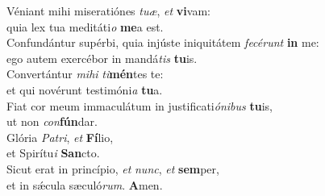 \oddverse Véniant mihi miseratiónes \textit{tu}\textit{æ}, \textit{et} \textbf{vi}vam:~\*\\
\oddverse quia lex tua meditáti\textit{o} \textbf{me}a est.\\
\evenverse Confundántur supérbi, quia injúste iniquitátem \textit{fe}\textit{cé}\textit{runt} \textbf{in} me:~\*\\
\evenverse ego autem exercébor in mandá\textit{tis} \textbf{tu}is.\\
\oddverse Convertántur \textit{mi}\textit{hi} \textit{ti}\textbf{mén}tes te:~\*\\
\oddverse et qui novérunt testimóni\textit{a} \textbf{tu}a.\\
\evenverse Fiat cor meum immaculátum in justificati\textit{ó}\textit{ni}\textit{bus} \textbf{tu}is,~\*\\
\evenverse ut non \textit{con}\textbf{fún}dar.\\
\oddverse Glória \textit{Pa}\textit{tri}, \textit{et} \textbf{Fí}lio,~\*\\
\oddverse et Spirítu\textit{i} \textbf{San}cto.\\
\evenverse Sicut erat in princípio, \textit{et} \textit{nunc}, \textit{et} \textbf{sem}per,~\*\\
\evenverse et in sǽcula sæculó\textit{rum}. \textbf{A}men.\\
